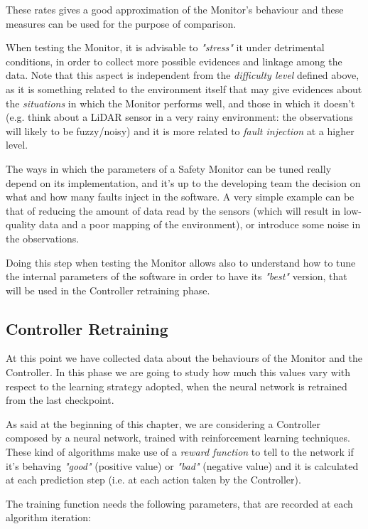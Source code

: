 These rates gives a good approximation of the Monitor's behaviour and these measures can be used for the purpose of comparison.

When testing the Monitor, it is advisable to \textsl{"stress"} it under detrimental conditions, in order to collect more possible evidences and linkage among the data. Note that this aspect is independent from the \textsl{difficulty level} defined above, as it is something related to the environment itself that may give evidences about the \textsl{situations} in which the Monitor performs well, and those in which it doesn't (e.g. think about a LiDAR sensor in a very rainy environment: the observations will likely to be fuzzy/noisy) and it is more related to \textsl{fault injection} at a higher level.

The ways in which the parameters of a Safety Monitor can be tuned really depend on its implementation, and it's up to the developing team the decision on what and how many faults inject in the software. A very simple example can be that of reducing the amount of data read by the sensors (which will result in low-quality data and a poor mapping of the environment), or introduce some noise in the observations.

Doing this step when testing the Monitor allows also to understand how to tune the internal parameters of the software in order to have its \textsl{"best"} version, that will be used in the Controller retraining phase.

\subsection{Controller Retraining}

At this point we have collected data about the behaviours of the Monitor and the Controller. In this phase we are going to study how much this values vary with respect to the learning strategy adopted, when the neural network is retrained from the last checkpoint.

As said at the beginning of this chapter, we are considering a Controller composed by a neural network, trained with reinforcement learning techniques. These kind of algorithms make use of a \textsl{reward function} to tell to the network if it's behaving \textsl{"good"} (positive value) or \textsl{"bad"} (negative value) and it is calculated at each prediction step (i.e. at each action taken by the Controller).\newline

The training function needs the following parameters, that are recorded at each algorithm iteration:

